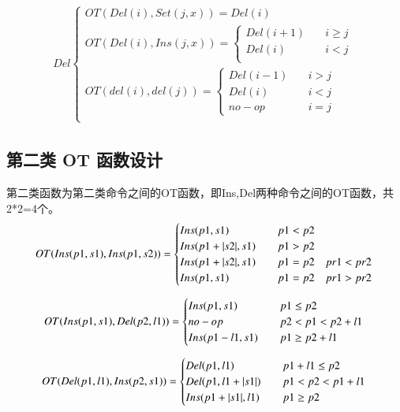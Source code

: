 \begin{equation}
\begin{aligned}
Del \begin{cases}
OT(Del (i), Set (j,x)) =
	{Del(i)}\\
OT(Del (i), Ins (j,x)) =\begin{cases}
	{Del (i+1)}  \quad &i \ge j\\
	{Del (i)}   \quad &i < j\\ \end{cases}\\
OT(del (i), del (j)) =\begin{cases}
	{Del (i-1)} \quad &i > j\\
	{Del (i)} \quad &i < j\\
	{no-op}   \quad &i = j \end{cases}\\
\end{cases}
\end{aligned}
\end{equation}

\subsection{第二类 OT 函数设计}
第二类函数为第二类命令之间的OT函数，即Ins,Del两种命令之间的OT函数，共2*2=4个。
\begin{equation}
OT(Ins(p1,s1),Ins(p1,s2))= \begin{cases}
Ins(p1,s1) \quad & p1<p2 \\
Ins(p1+ |s2|,s1) \quad & p1>p2 \\
Ins(p1+ |s2|,s1) \quad & p1=p2 \quad pr1<pr2 \\
Ins(p1,s1) \quad & p1=p2 \quad pr1>pr2
 \end{cases}\\
\end{equation}

\begin{equation}
OT(Ins(p1,s1),Del(p2,l1))= \begin{cases}
Ins(p1,s1) \quad & p1 \le p2 \\
no-op \quad & p2<p1<p2+l1\\
Ins(p1-l1,s1) \quad & p1 \ge p2+l1 \end{cases}\\
\end{equation}

\begin{equation}
OT(Del(p1,l1),Ins(p2,s1))= \begin{cases}
Del(p1,l1) \quad & p1 + l1 \le p2 \\
Del(p1,l1+|s1|) \quad & p1<p2<p1+l1 \\
Ins(p1+ |s1|,l1) \quad & p1 \ge p2 \end{cases}\\
\end{equation}

